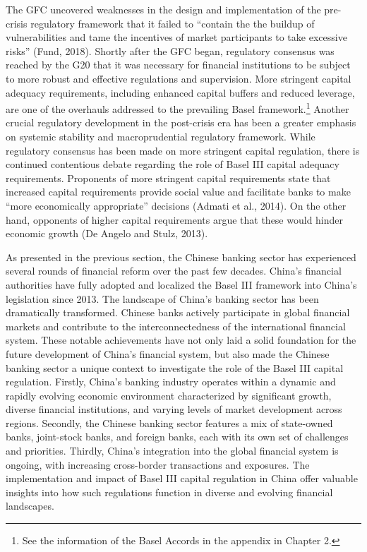 \documentclass[
  12pt,
  a4paper,
]{scrreprt}
\begin{document}
The GFC uncovered weaknesses in the design and implementation of the
pre-crisis regulatory framework that it failed to ``contain the the
buildup of vulnerabilities and tame the incentives of market
participants to take excessive risks'' (Fund, 2018). Shortly after the
GFC began, regulatory consensus was reached by the G20 that it was
necessary for financial institutions to be subject to more robust and
effective regulations and supervision. More stringent capital adequacy
requirements, including enhanced capital buffers and reduced leverage,
are one of the overhauls addressed to the prevailing Basel
framework.\footnote{See the information of the Basel Accords in the
  appendix in Chapter 2.} Another crucial regulatory development in the
post-crisis era has been a greater emphasis on systemic stability and
macroprudential regulatory framework. While regulatory consensus has
been made on more stringent capital regulation, there is continued
contentious debate regarding the role of Basel III capital adequacy
requirements. Proponents of more stringent capital requirements state
that increased capital requirements provide social value and facilitate
banks to make ``more economically appropriate'' decisions (Admati et
al., 2014). On the other hand, opponents of higher capital requirements
argue that these would hinder economic growth (De Angelo and Stulz,
2013).

As presented in the previous section, the Chinese banking sector has
experienced several rounds of financial reform over the past few
decades. China's financial authorities have fully adopted and localized
the Basel III framework into China's legislation since 2013. The
landscape of China's banking sector has been dramatically transformed.
Chinese banks actively participate in global financial markets and
contribute to the interconnectedness of the international financial
system. These notable achievements have not only laid a solid foundation
for the future development of China's financial system, but also made
the Chinese banking sector a unique context to investigate the role of
the Basel III capital regulation. Firstly, China's banking industry
operates within a dynamic and rapidly evolving economic environment
characterized by significant growth, diverse financial institutions, and
varying levels of market development across regions. Secondly, the
Chinese banking sector features a mix of state-owned banks, joint-stock
banks, and foreign banks, each with its own set of challenges and
priorities. Thirdly, China's integration into the global financial
system is ongoing, with increasing cross-border transactions and
exposures. The implementation and impact of Basel III capital regulation
in China offer valuable insights into how such regulations function in
diverse and evolving financial landscapes.
\end{document}
